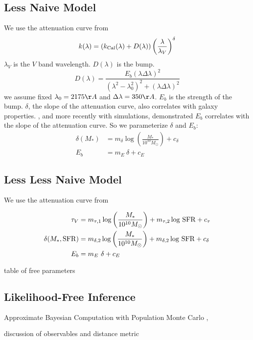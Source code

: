 \subsection{Less Naive Model} 
We use the attenuation curve from \cite{noll2009} 
\begin{equation}
    k(\lambda) = \left(k_{\rm Cal}(\lambda) + D(\lambda)\right) \left(
    \frac{\lambda}{\lambda_V} \right)^\delta
\end{equation}
$\lambda_V$ is the $V$ band wavelength. $D(\lambda)$ is the bump. 
\begin{equation}
    D(\lambda) = \frac{E_b(\lambda \Delta \lambda)^2}{(\lambda^2 -
    \lambda_0^2)^2 + (\lambda \Delta \lambda)^2}
\end{equation}
we assume fixed $\lambda_0 = 2175 \AA$ and $\Delta \lambda = 350\AA$. $E_b$ is
the strength of the bump.
$\delta$, the slope of the attenuation curve, also correlates with galaxy
properties.
\cite{kriek2013}, and \cite{naranyanan2018} more recently with simulations, 
demonstrated $E_b$ correlates with the slope of the attenuation curve.
So we parameterize $\delta$ and $E_b$: 
\begin{align}
    \delta(M_*) &= m_\delta \log \left(\frac{M_*}{10^{10}
    M_\odot}\right) + c_\delta \\
    E_b &= m_E~\delta + c_E
\end{align}

\subsection{Less Less Naive Model} 
We use the attenuation curve from \cite{noll2009} 


\begin{align}
    \tau_V &= m_{\tau,1} \log \left(\frac{M_*}{10^{10} M_\odot}\right) +
    m_{\tau,2} \log\,{\rm SFR} + c_\tau \\ 
    \delta(M_*, {\rm SFR}) &= m_{\delta,2} \log \left(\frac{M_*}{10^{10}
    M_\odot}\right) + m_{\delta,2} \log\,{\rm SFR} + c_\delta \\
    E_b &= m_E~\delta + c_E
\end{align}


\begin{table}
    table of free parameters 
\end{table} 


\subsection{Likelihood-Free Inference} 
Approximate Bayesian Computation with Population Monte Carlo \cite{hahn2017a},

discussion of observables and distance metric 
\cite{ishida2015} 

